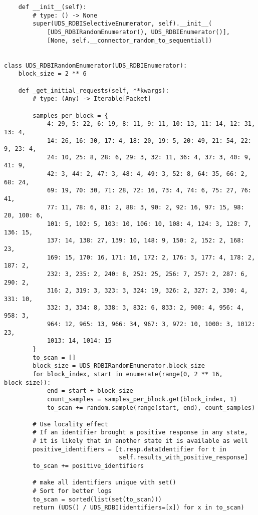 \begin{verbatim}
    def __init__(self):
        # type: () -> None
        super(UDS_RDBISelectiveEnumerator, self).__init__(
            [UDS_RDBIRandomEnumerator(), UDS_RDBIEnumerator()],
            [None, self.__connector_random_to_sequential])


class UDS_RDBIRandomEnumerator(UDS_RDBIEnumerator):
    block_size = 2 ** 6

    def _get_initial_requests(self, **kwargs):
        # type: (Any) -> Iterable[Packet]

        samples_per_block = {
            4: 29, 5: 22, 6: 19, 8: 11, 9: 11, 10: 13, 11: 14, 12: 31, 13: 4,
            14: 26, 16: 30, 17: 4, 18: 20, 19: 5, 20: 49, 21: 54, 22: 9, 23: 4,
            24: 10, 25: 8, 28: 6, 29: 3, 32: 11, 36: 4, 37: 3, 40: 9, 41: 9,
            42: 3, 44: 2, 47: 3, 48: 4, 49: 3, 52: 8, 64: 35, 66: 2, 68: 24,
            69: 19, 70: 30, 71: 28, 72: 16, 73: 4, 74: 6, 75: 27, 76: 41,
            77: 11, 78: 6, 81: 2, 88: 3, 90: 2, 92: 16, 97: 15, 98: 20, 100: 6,
            101: 5, 102: 5, 103: 10, 106: 10, 108: 4, 124: 3, 128: 7, 136: 15,
            137: 14, 138: 27, 139: 10, 148: 9, 150: 2, 152: 2, 168: 23,
            169: 15, 170: 16, 171: 16, 172: 2, 176: 3, 177: 4, 178: 2, 187: 2,
            232: 3, 235: 2, 240: 8, 252: 25, 256: 7, 257: 2, 287: 6, 290: 2,
            316: 2, 319: 3, 323: 3, 324: 19, 326: 2, 327: 2, 330: 4, 331: 10,
            332: 3, 334: 8, 338: 3, 832: 6, 833: 2, 900: 4, 956: 4, 958: 3,
            964: 12, 965: 13, 966: 34, 967: 3, 972: 10, 1000: 3, 1012: 23,
            1013: 14, 1014: 15
        }
        to_scan = []
        block_size = UDS_RDBIRandomEnumerator.block_size
        for block_index, start in enumerate(range(0, 2 ** 16, block_size)):
            end = start + block_size
            count_samples = samples_per_block.get(block_index, 1)
            to_scan += random.sample(range(start, end), count_samples)

        # Use locality effect
        # If an identifier brought a positive response in any state,
        # it is likely that in another state it is available as well
        positive_identifiers = [t.resp.dataIdentifier for t in
                                self.results_with_positive_response]
        to_scan += positive_identifiers

        # make all identifiers unique with set()
        # Sort for better logs
        to_scan = sorted(list(set(to_scan)))
        return (UDS() / UDS_RDBI(identifiers=[x]) for x in to_scan)
\end{verbatim}
